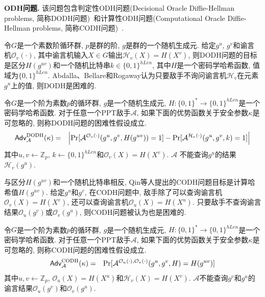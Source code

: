 \medskip\noindent\textbf{ODH问题.} 该问题包含判定性ODH问题(Decisional Oracle Diffie-Hellman problems, 简称DODH问题)~\cite{ABR2001}和计算性ODH问题(Computational Oracle Diffie-Hellman problems, 简称CODH问题)~\cite{QCZZ-ProvSec-2021}.

令$G$是一个素数阶循环群, $p$是群的阶, $g$是群的一个随机生成元. 给定$g^u$, $g^v$和谕言机$\mathcal{O}_v(\cdot)$, 其中谕言机输入$X \in G$输出$\mathcal{H}_v(X)=H(X^v)$, 则DODH问题的目标是区分$H(g^{uv})$和一个随机比特串$k \in \{0, 1\}^{hLen}$, 其中$H$是一个密码学哈希函数, 值域为$\{0, 1\}^{hLen}$. Abdalla、Bellare和Rogaway认为只要敌手不询问谕言机$\mathcal{H}_v$在元素$g^u$上的值, 则DODH是困难的.  
\begin{definition}
令$G$是一个阶为素数$p$的循环群, $g$是一个随机生成元, $H:\{0, 1\}^* \rightarrow \{0, 1\}^{hLen}$是一个密码学哈希函数. 对于任意一个PPT敌手$\mathcal{A}$, 如果下面的优势函数关于安全参数$\kappa$是可忽略的, 则称DODH问题的困难性假设成立.
\begin{eqnarray*}
\mathsf{Adv}_{\mathcal{A}}^{\textup{DODH}}(\kappa) & = &\left|\textup{Pr}[\mathcal{A}^{\mathcal{O}_v(\cdot)}(g^u, g^v, H(g^{uv})) = 1] - \textup{Pr}[\mathcal{A}^{\mathcal{H}_v(\cdot)}(g^u, g^v, k) = 1]\right|
\end{eqnarray*}
其中$u, v \gets \mathbb{Z}_p$, $k \gets \{0, 1\}^{hLen}$和$\mathcal{O}_v(X) = H(X^v)$. $\mathcal{A}$ 不能查询$g^u$的结果$\mathcal{H}_v(g^u)$.
\end{definition}

与区分$H(g^{uv})$和一个随机比特串相反, Qin等人提出的CODH问题目标是计算哈希值$H(g^{uv})$. 给定$g^u$和$g^v$, 在CODH问题中, 敌手除了可以查询谕言机$\mathcal{O}_v(X)=H(X^v)$, 还可以查询谕言机$\mathcal{O}_u(X)=H(X^u)$. 只要敌手不查询谕言结果$\mathcal{O}_u(g^v)$或$\mathcal{O}_v(g^u)$, 则CODH问题被认为也是困难的.
\begin{definition}
令$G$是一个阶为素数$p$的循环群, $g$是一个随机生成元, $H:\{0, 1\}^* \rightarrow \{0, 1\}^{hLen}$是一个密码学哈希函数. 对于任意一个PPT敌手$\mathcal{A}$, 如果下面的优势函数关于安全参数$\kappa$是可忽略的, 则称CODH问题的困难性假设成立.
\begin{eqnarray*}
\mathsf{Adv}_{\mathcal{A}}^{\textup{CODH}}(\kappa)& = &\textup{Pr}[\mathcal{A}^{\mathcal{O}_u(\cdot),\mathcal{O}_v(\cdot)}(g^u, g^v, H) = H(g^{uv})]
\end{eqnarray*}
其中$u, v \gets \mathbb{Z}_p$, $\mathcal{O}_u(X) = H(X^u)$和$\mathcal{H}_v(X) = H(X^v)$. $\mathcal{A}$不能查询$g^v$和$g^u$的谕言结果$\mathcal{O}_u(g^v)$和$\mathcal{O}_v(g^u)$.
\end{definition}

